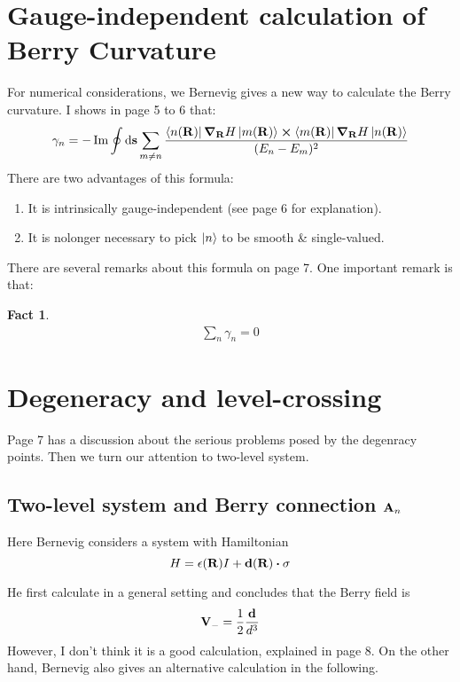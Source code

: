 \documentclass{article}
\numberwithin{equation}{subsection} %
\newtheorem{fact}{Fact}[section]
\theoremstyle{definition}
\begin{document}
\section{Gauge-independent calculation of Berry Curvature}
\label{sec:Gauge-independent-calculation-of-Berry-Curvature}
For numerical considerations, we Bernevig gives a new way to calculate
the Berry curvature. I shows in page 5 to 6 that:
\begin{align}
    \gamma_n = -\Im \oint \dd\vb{s} \sum_{m\neq n}
    \frac{\bra{n(\vb{R})}\grad_{\vb{R}} H \ket{m(\vb{R})}
        \cross \bra{m(\vb{R})}\grad_{\vb{R}} H \ket{n(\vb{R})} }
        {(E_n-E_m)^2}
\end{align}
There are two advantages of this formula:
\begin{enumerate}
    \item It is intrinsically gauge-independent (see page 6 for
        explanation).
    \item It is nolonger necessary to pick $\ket{n}$ to be smooth \&
        single-valued. 
\end{enumerate}
There are several remarks about this formula on page 7. One important
remark is that:
\begin{fact}
    \begin{align}
        \sum_n \gamma_n = 0
    \end{align}
\end{fact}

\section{Degeneracy and level-crossing}
\label{sec:Degeneracy-and-level-crossing}
Page 7 has a discussion about the serious problems posed by the
degenracy points. Then we turn our attention to two-level system.

    \subsection{Two-level system and Berry connection
    \texorpdfstring{$\vb{A}_n$}{}}
    \label{sec:Two-level-system-and-Berry-connection}
    Here Bernevig considers a system with Hamiltonian
    \begin{equation}
        H = \epsilon(\vb{R}) I + \vb{d}(\vb{R})\vdot\vb{\sigma}
    \end{equation}

    He first calculate in a general setting and concludes that the Berry
    field is
    \begin{equation}
        \vb{V}_{-} = \frac{1}{2}\frac{\vb{d}}{d^3}
    \end{equation}
    However, I don't think it is a good calculation, explained in page 8.
    On the other hand, Bernevig also gives an alternative calculation in
    the following.
\end{document}
